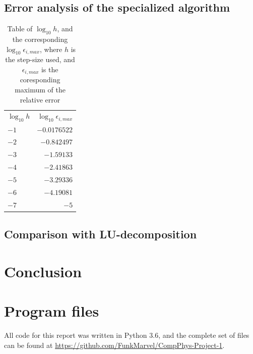\documentclass[english,notitlepage]{revtex4-1}  %
\begin{document}
\subsection{Error analysis of the specialized algorithm}\label{subsec:43}
\begin{table}[H]
	\centering
	\label{tab:431}
	\begin{tabular}{l|r}
	\(\log_{10}h\) & \(\log_{10}\epsilon_{i,max}\) \\
	\(-1\) & \(-0.0176522\) \\
	\(-2\) & \(-0.842497\) \\
	\(-3\) & \(-1.59133\) \\
	\(-4\) & \(-2.41863\) \\
	\(-5\) & \(-3.29336\) \\
	\(-6\) & \(-4.19081\) \\
	\(-7\) & \(-5\) \\
	\end{tabular}
	\caption{Table of \(\log_{10}h\), and the corresponding \(\log_{10}\epsilon_{i,max}\),
	where \(h\) is the step-size used, and \(\epsilon_{i,max}\) is the coresponding
	maximum of the relative error}
\end{table}

\subsection{Comparison with LU-decomposition}\label{subsec:43}

\section{Conclusion}\label{sec:5}

\appendix
\section{Program files} \label{A}
All code for this report was written in Python 3.6, and the complete set of files can be found at \url{https://github.com/FunkMarvel/CompPhys-Project-1}.
\end{document}
